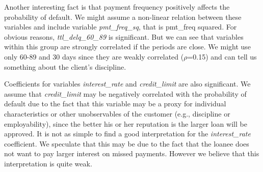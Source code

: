 \documentclass[12pt,a4paper]{article}
\begin{document}
Another interesting fact is that payment frequency positively affects the probability of default. We might assume a non-linear relation between these variables and include variable \textit{pmt\_freq\_sq}, that is pmt\_freq squared. For obvious reasons, \textit{ttl\_delq\_60\_89} is significant. But we can see that variables within this group are strongly correlated if the periods are close. We might use only 60-89 and 30 days since they are weakly correlated ($\rho$=0.15) and can tell us something about the client's discipline.

Coefficients for variables \textit{interest\_rate} and \textit{credit\_limit} are also significant. We assume that \textit{credit\_limit} may be negatively correlated with the probability of default due to the fact that this variable may be a proxy for individual characteristics or other unobservables of the customer (e.g., discipline or employability), since the better his or her reputation is the larger loan will be approved. It is not as simple to find a good interpretation for the \textit{interest\_rate} coefficient. We speculate that this may be due to the fact that the loanee does not want to pay larger interest on missed payments. However we believe that this interpretation is quite weak.
\end{document}
